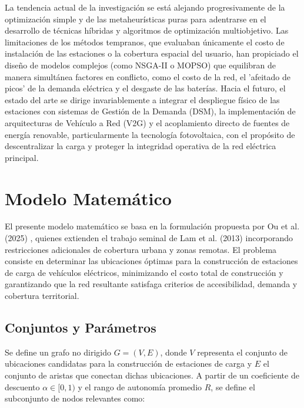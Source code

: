 \documentclass[letter, 10pt]{article}
\begin{document}
La tendencia actual de la investigación se está alejando progresivamente de la optimización simple y de las metaheurísticas puras para adentrarse en el desarrollo de técnicas híbridas y algoritmos de optimización multiobjetivo\cite{5_Metaheuristic_FLP}\cite{7_recent_trends_optimization_techniques}.
Las limitaciones de los métodos tempranos, que evaluaban únicamente el costo de instalación de las estaciones o la cobertura espacial del usuario, han propiciado el diseño de modelos complejos (como NSGA-II o MOPSO) que equilibran de manera simultánea factores en conflicto, como el costo de la red, el 'afeitado de picos' de la demanda eléctrica y el desgaste de las baterías\cite{7_recent_trends_optimization_techniques}. Hacia el futuro, el estado del arte se dirige invariablemente a integrar el despliegue físico de las estaciones con sistemas de Gestión de la Demanda (DSM), la implementación de arquitecturas de Vehículo a Red (V2G) y el acoplamiento directo de fuentes de energía renovable, particularmente la tecnología fotovoltaica, con el propósito de descentralizar la carga y proteger la integridad operativa de la red eléctrica principal\cite{7_recent_trends_optimization_techniques}.


\section{Modelo Matem\'atico}

El presente modelo matemático se basa en la formulación propuesta por Ou et al. (2025) \cite{1_Solving_optimal_evcsp_problem_QUANTUM}, 
quienes extienden el trabajo seminal de Lam et al. (2013) \cite{2_EVCSP_2013-ieee-conference} incorporando restricciones 
adicionales de cobertura urbana y zonas remotas. El problema consiste en determinar las 
ubicaciones óptimas para la construcción de estaciones de carga de vehículos eléctricos, 
minimizando el costo total de construcción y garantizando que la red resultante satisfaga 
criterios de accesibilidad, demanda y cobertura territorial.

\subsection{Conjuntos y Parámetros}

Se define un grafo no dirigido $G = (V, E)$, donde $V$ representa el conjunto de ubicaciones 
candidatas para la construcción de estaciones de carga y $E$ el conjunto de aristas que conectan 
dichas ubicaciones. A partir de un coeficiente de descuento $\alpha \in [0, 1)$ y el rango de 
autonomía promedio $R$, se define el subconjunto de nodos relevantes como:
\end{document}
